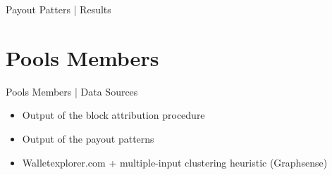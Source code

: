\documentclass[10pt]{beamer}
\begin{document}
\begin{frame}[fragile]{Payout Patters | Results}
    \setlength{\tabcolsep}{2pt}
    \begin{table}
        \centering
        \caption{Statistics of retrieved data between block 510,000 and 514,032 ($\sim$ 4 weeks). $N_{B}$: number of blocks mined by the pool, $N_{TX}$: number of identified payout transactions, $N_{A}$: number of identified members' addresses, $N_{C}$: number of identified clusters, $BTC_{M}$: BTC mined by the pool, $BTC_{P}$: BTC paid to pool members (addresses), $\mu$: median value of address reuse.}\label{miners_stats}
    \end{table}
\end{frame}

\section{Pools Members} 
\begin{frame}[fragile]{Pools Members | Data Sources}
    \begin{itemize}
        \item Output of the block attribution procedure
        \item Output of the payout patterns
        \item Walletexplorer.com + multiple-input clustering heuristic (Graphsense)
    \end{itemize}
\end{frame}
\end{document}
